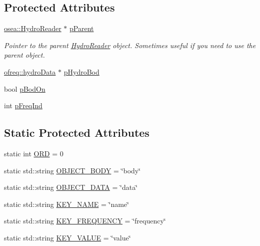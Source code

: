 \subsection*{Protected Attributes}
\begin{DoxyCompactItemize}
\item 
\hyperlink{classosea_1_1_hydro_reader}{osea\-::\-Hydro\-Reader} $\ast$ \hyperlink{classosea_1_1dicthydro_react_a0f644ee04c3e63d39761165a12cfef21}{p\-Parent}
\begin{DoxyCompactList}\small\item\em Pointer to the parent \hyperlink{classosea_1_1_hydro_reader}{Hydro\-Reader} object. Sometimes useful if you need to use the parent object. \end{DoxyCompactList}\item 
\hyperlink{classosea_1_1ofreq_1_1hydro_data}{ofreq\-::hydro\-Data} $\ast$ \hyperlink{classosea_1_1dicthydro_react_a1adaabcc5bbbbd37a0a8fdd2812f5bd6}{p\-Hydro\-Bod}
\item 
bool \hyperlink{classosea_1_1dicthydro_react_a66a8bc48d4406b143b7050e2086b6cbb}{p\-Bod\-On}
\item 
int \hyperlink{classosea_1_1dicthydro_react_aba130db9eb0cd8aa4203bb2a58fb4932}{p\-Freq\-Ind}
\end{DoxyCompactItemize}
\subsection*{Static Protected Attributes}
\begin{DoxyCompactItemize}
\item 
static int \hyperlink{classosea_1_1dicthydro_react_a4fbb539436f3d6ab7d8e4d354db291ad}{O\-R\-D} = 0
\item 
static std\-::string \hyperlink{classosea_1_1dicthydro_react_a29b13546ba418a88b771796696433955}{O\-B\-J\-E\-C\-T\-\_\-\-B\-O\-D\-Y} = \char`\"{}body\char`\"{}
\item 
static std\-::string \hyperlink{classosea_1_1dicthydro_react_aadf52b76941055136df1d8c74aa67077}{O\-B\-J\-E\-C\-T\-\_\-\-D\-A\-T\-A} = \char`\"{}data\char`\"{}
\item 
static std\-::string \hyperlink{classosea_1_1dicthydro_react_a489f3104a318cd418c2646f63d3b0f97}{K\-E\-Y\-\_\-\-N\-A\-M\-E} = \char`\"{}name\char`\"{}
\item 
static std\-::string \hyperlink{classosea_1_1dicthydro_react_a281e3ae225b1959152f22979c12a60a5}{K\-E\-Y\-\_\-\-F\-R\-E\-Q\-U\-E\-N\-C\-Y} = \char`\"{}frequency\char`\"{}
\item 
static std\-::string \hyperlink{classosea_1_1dicthydro_react_acee862a95117a816d7fd3c634f935a85}{K\-E\-Y\-\_\-\-V\-A\-L\-U\-E} = \char`\"{}value\char`\"{}
\end{DoxyCompactItemize}
